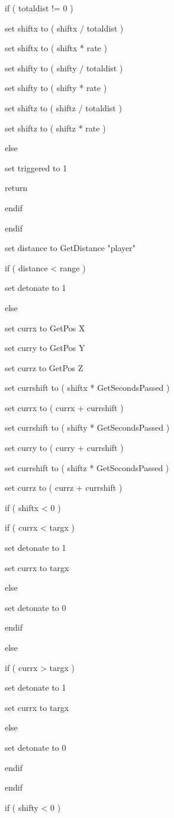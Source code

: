 \documentclass[
]{article}
\begin{document}
if ( totaldist != 0 )

set shiftx to ( shiftx / totaldist )

set shiftx to ( shiftx * rate )

set shifty to ( shifty / totaldist )

set shifty to ( shifty * rate )

set shiftz to ( shiftz / totaldist )

set shiftz to ( shiftz * rate )

else

set triggered to 1

return

endif

endif

set distance to GetDistance "player"

if ( distance \textless{} range )

set detonate to 1

else

set currx to GetPos X

set curry to GetPos Y

set currz to GetPos Z

set currshift to ( shiftx * GetSecondsPassed )

set currx to ( currx + currshift )

set currshift to ( shifty * GetSecondsPassed )

set curry to ( curry + currshift )

set currshift to ( shiftz * GetSecondsPassed )

set currz to ( currz + currshift )

if ( shiftx \textless{} 0 )

if ( currx \textless{} targx )

set detonate to 1

set currx to targx

else

set detonate to 0

endif

else

if ( currx \textgreater{} targx )

set detonate to 1

set currx to targx

else

set detonate to 0

endif

endif

if ( shifty \textless{} 0 )
\end{document}
